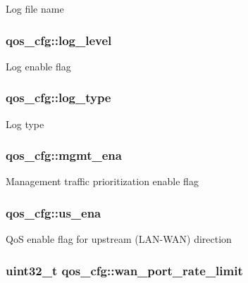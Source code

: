 Log file name \hypertarget{structqos__cfg_a382d14c25eaeaf4f01950a06336314ba}{
\subsubsection[{log\-\_\-level}]{ qos\-\_\-cfg\-::log\-\_\-level}}\label{structqos__cfg_a382d14c25eaeaf4f01950a06336314ba}
Log enable flag \hypertarget{structqos__cfg_a6e170fd5d9d374ad405021dae66c7f93}{
\subsubsection[{log\-\_\-type}]{ qos\-\_\-cfg\-::log\-\_\-type}}\label{structqos__cfg_a6e170fd5d9d374ad405021dae66c7f93}
Log type \hypertarget{structqos__cfg_af61eb747637f5d2f4db1d09362b8b9f4}{
\subsubsection[{mgmt\-\_\-ena}]{ qos\-\_\-cfg\-::mgmt\-\_\-ena}}\label{structqos__cfg_af61eb747637f5d2f4db1d09362b8b9f4}
Management traffic prioritization enable flag \hypertarget{structqos__cfg_acad8e74b9b0261e29631422506b0d73f}{
\subsubsection[{us\-\_\-ena}]{ qos\-\_\-cfg\-::us\-\_\-ena}}\label{structqos__cfg_acad8e74b9b0261e29631422506b0d73f}
Qo\-S enable flag for upstream (L\-A\-N-\/\-W\-A\-N) direction \hypertarget{structqos__cfg_a61020b43790df2ef68593160680ebc5d}{
\subsubsection[{wan\-\_\-port\-\_\-rate\-\_\-limit}]{\setlength{\rightskip}{0pt plus 5cm}uint32\-\_\-t qos\-\_\-cfg\-::wan\-\_\-port\-\_\-rate\-\_\-limit}}\label{structqos__cfg_a61020b43790df2ef68593160680ebc5d}
